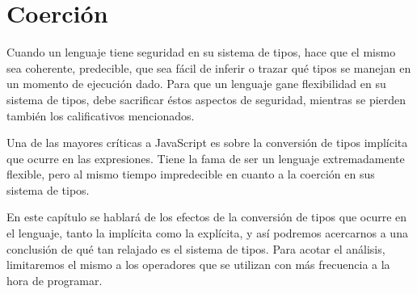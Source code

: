 \chapter{Coerción} %

\label{ch:coercion} %

Cuando un lenguaje tiene seguridad en su sistema de tipos, hace que el mismo sea coherente, predecible, que sea fácil de inferir o trazar qué tipos se manejan en un momento de ejecución dado. Para que un lenguaje gane flexibilidad en su sistema de tipos, debe sacrificar éstos aspectos de seguridad, mientras se pierden también los calificativos mencionados.

Una de las mayores críticas a JavaScript es sobre la conversión de tipos implícita que ocurre en las expresiones. Tiene la fama de ser un lenguaje extremadamente flexible, pero al mismo tiempo impredecible en cuanto a la coerción en sus sistema de tipos. 

En este capítulo se hablará de los efectos de la conversión de tipos que ocurre en el lenguaje, tanto la implícita como la explícita, y así podremos acercarnos a una conclusión de qué tan relajado es el sistema de tipos. Para acotar el análisis, limitaremos el mismo a los operadores que se utilizan con más frecuencia a la hora de programar.






